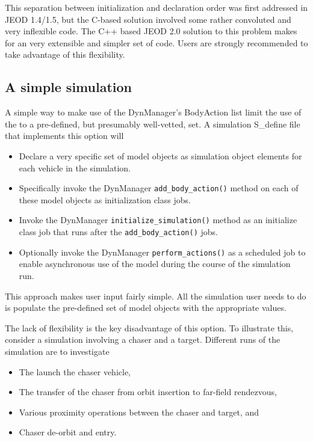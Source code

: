 This separation between initialization and declaration order
was first addressed in JEOD 1.4/1.5, but the C-based solution
involved some rather convoluted and very inflexible code.
The C++ based JEOD 2.0 solution to this problem makes for
an very extensible and simpler set of code. Users are strongly
recommended to take advantage of this flexibility.

\subsection{A simple simulation}
A simple way to make use of the DynManager's BodyAction list
limit the use of the \ModelDesc to a pre-defined,
but presumably well-vetted, set.
A simulation S\_define file that implements this option will
\begin{itemize}
\item Declare a very specific set of model objects as simulation
object elements for each vehicle in the simulation.
\item Specifically invoke the DynManager {\tt add\_body\_action()}
method on each of these model objects as initialization class jobs.
\item Invoke the DynManager {\tt initialize\_simulation()} method
as an initialize class job that runs after the {\tt add\_body\_action()}
jobs.
\item Optionally invoke the DynManager {\tt perform\_actions()}
as a scheduled job to enable asynchronous use of the model during
the course of the simulation run.
\end{itemize}

This approach makes user input fairly simple. All
the simulation user needs to do is populate the pre-defined set of
model objects with the appropriate values.

The lack of flexibility is the key disadvantage of this option.
To illustrate this, consider a simulation involving a chaser and a target.
Different runs of the simulation are to investigate
\begin{itemize}
\item The launch the chaser vehicle,
\item The transfer of the chaser from orbit insertion to far-field rendezvous,
\item Various proximity operations between the chaser and target, and
\item Chaser de-orbit and entry.
\end{itemize}

